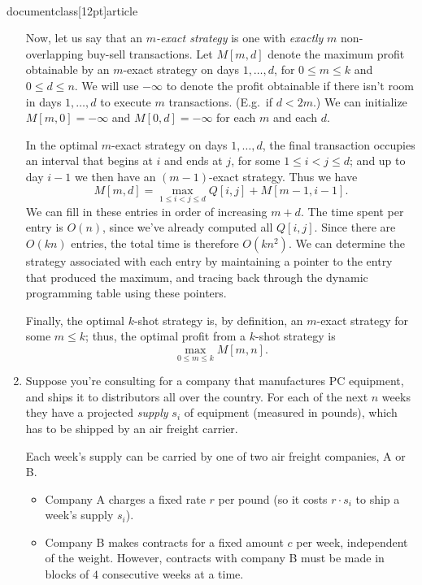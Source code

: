 \\documentclass[12pt]{article}
\begin{document}
\begin{enumerate}
{Now, let us say that an {\em $m$-exact strategy}
is one with {\em exactly} $m$ non-overlapping buy-sell transactions.
Let $M[m,d]$ denote the maximum profit obtainable 
by an $m$-exact strategy on days $1, \ldots, d$,
for $0 \leq m \leq k$ and $0 \leq d \leq n$.
We will use $-\infty$ to denote the profit obtainable
if there isn't room in days $1, \ldots, d$ to execute
$m$ transactions.  (E.g.~if $d < 2m$.)
We can initialize $M[m,0] = -\infty$ and $M[0,d] = -\infty$
for each $m$ and each $d$.

In the optimal $m$-exact strategy on days
$1, \ldots, d$, the final transaction occupies an 
interval that begins at $i$ and ends at $j$,
for some $1 \leq i < j \leq d$;
and up to day $i-1$ we then have an $(m-1)$-exact strategy.
Thus we have
$$M[m,d] = \max_{1 \leq i < j \leq d} Q[i,j] + M[m-1,i-1].$$
We can fill in these entries in order of increasing $m + d$.
The time spent per entry is $O(n)$, 
since we've already computed all $Q[i,j]$.
Since there are $O(kn)$ entries, the total time is therefore $O(kn^2)$.
We can determine the strategy associated with
each entry by maintaining a pointer to the entry 
that produced the maximum, and tracing back through
the dynamic programming table using these pointers.

Finally, the optimal $k$-shot strategy is, by definition,
an $m$-exact strategy for some $m \leq k$;
thus, the optimal profit from a $k$-shot strategy is
$$\max_{0 \leq m \leq k} M[m,n].$$
}





\item

Suppose you're consulting for a company that manufactures
PC equipment, and ships it to distributors all over the country.
For each of the next $n$ weeks they have a projected
{\em supply} $s_i$ of equipment (measured in pounds),
which has to be shipped by an air freight carrier.

Each week's supply can be carried by one of two air freight companies, A or B.
\begin{itemize}
\item Company A charges a fixed rate $r$ per pound
(so it costs $r \cdot s_i$ to ship a week's supply $s_i$).
\item Company B makes contracts for a fixed amount $c$ per week,
independent of the weight.  However, contracts with
company B must be made in blocks of $4$ consecutive weeks at a time.
\end{itemize}


\end{enumerate}
\end{document}
